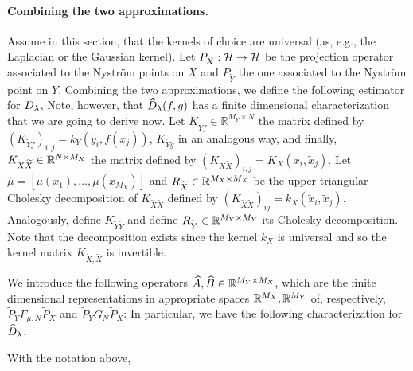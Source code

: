 \paragraph{Combining the two approximations.}
Assume in this section, that the kernels of choice are universal (as, e.g., the Laplacian or the Gaussian kernel).
Let $P_{\tilde{X}}:\mathcal H \to \mathcal H$ be the projection operator associated to the Nystr\"om points on $X$ and $P_{\tilde{Y}}$ the one associated to the Nystr\"om point on $Y$. Combining the two approximations, we define the following estimator for $D_\lambda$,
Note, however, that $\widehat{D}_\lambda(f,g)$ has a finite dimensional characterization that we are going to derive now.
Let $K_{\widetilde Y f} \in \mathbb R^{M_Y \times N}$ the matrix defined by $(K_{\widetilde Y f})_{i, j} = k_Y(\widetilde y_i, f(x_j))$, $K_{\widetilde Y g}$ in an analogous way, and finally, $K_{X \widetilde X}\in\mathbb R^{N \times M_X}$ the matrix defined by $(K_{X\widetilde X})_{i, j} = K_X(x_i, \widetilde x_j)$. Let $\widehat \mu = \left[ \mu(x_1), \ldots, \mu(x_{M_X})\right]$ and $R_{\widetilde X} \in\mathbb R^{M_X \times M_X}$ be the upper-triangular Cholesky decomposition of $K_{\widetilde X \widetilde X}$ defined by $(K_{\widetilde X \widetilde X})_{ij} = k_X(\widetilde x_i, \widetilde x_j)$. Analogously, define $K_{\widetilde Y \widetilde Y}$ and define $R_{\widetilde Y}\in\mathbb R^{M_Y \times M_Y}$ its Cholesky decomposition. Note that the decomposition exists since the kernel $k_X$ is universal and so the kernel matrix $K_{\tilde{X},\tilde{X}}$ is invertible.


We introduce the following operators $\widehat{A}, \widehat{B} \in \mathbb R^{M_Y \times M_X}$, which are the finite dimensional representations in appropriate spaces $\mathbb R^{M_X}, \mathbb R^{M_Y}$ of, respectively, $\tilde{P}_Y F_{\mu, N} \tilde{P}_X$ and $\tilde{P}_Y G_N \tilde{P}_X$:
In particular, we have the following characterization for $\widehat{D}_\lambda$.
\begin{lemma}\label{lm:widehatD}
With the notation above,
\end{lemma}

